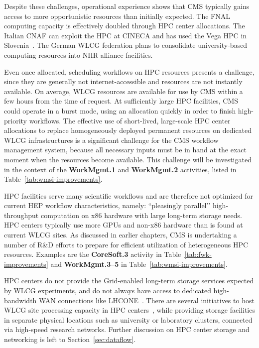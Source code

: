 Despite these challenges, operational experience shows that CMS typically gains access to more opportunistic resources than initially expected. The \gls{FNAL} \TierOne computing capacity is effectively doubled through \gls{HPC} center allocations. The Italian CNAF \TierOne can exploit the \gls{HPC} at CINECA and has used the Vega \gls{HPC} in Slovenia~\cite{cnaf:spiga}. The German \gls{WLCG} federation plans to consolidate university-based \TierTwo computing resources into \gls{NHR} alliance facilities.

Even once allocated, scheduling workflows on \gls{HPC} resources presents a challenge, since they are generally not internet-accessible and resources are not instantly available. On average, \gls{WLCG} resources are available for use by CMS within a few hours from the time of request. At sufficiently large \gls{HPC} facilities, CMS could operate in a burst mode, using an allocation quickly in order to finish high-priority workflows. The effective use of short-lived, large-scale \gls{HPC} center allocations to replace homogeneously deployed permanent resources on dedicated \gls{WLCG} infrastructures is a significant challenge for the CMS workflow management system, because all necessary inputs must be in hand at the exact moment when the resources become available. This challenge will be investigated in the context of the \textbf{WorkMgmt.1} and \textbf{WorkMgmt.2} activities, listed in Table~\ref{tab:wmsi-improvements}.

\gls{HPC} facilities serve many scientific workflows and are therefore not optimized for current \gls{HEP} workflow characteristics, namely: ``pleasingly parallel’’ high-throughput computation on x86 hardware with large long-term storage needs. \gls{HPC} centers typically use more \glspl{GPU} and non-x86 hardware than is found at current \gls{WLCG} sites. As discussed in earlier chapters, CMS is undertaking a number of R\&D efforts to prepare for efficient utilization of heterogeneous \gls{HPC} resources. Examples are the \textbf{CoreSoft.3} activity in Table~\ref{tab:fwk-improvements} and \textbf{WorkMgmt.3--5} in Table~\ref{tab:wmsi-improvements}.

\gls{HPC} centers do not provide the Grid-enabled long-term storage services expected by \gls{WLCG} experiments, and do not always have access to dedicated high-bandwidth \gls{WAN} connections like \gls{LHCONE}~\cite{LHCONEAUP}. There are several initiatives to host \gls{WLCG} site processing capacity in \gls{HPC} centers~\cite{Horzela:2024xmk}, while providing storage facilities in separate physical locations such as university or laboratory clusters, connected via high-speed research networks. Further discussion on \gls{HPC} center storage and networking is left to Section~\ref{sec:dataflow}.

